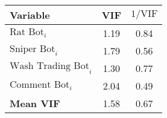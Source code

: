 \begin{tabular}{lcc}
\hline
Variable & VIF & $1/\text{VIF}$ \\
\hline
$\text{Rat Bot}_{i}$ & 1.19 & 0.84 \\
$\text{Sniper Bot}_{i}$ & 1.79 & 0.56 \\
$\text{Wash Trading Bot}_{i}$ & 1.30 & 0.77 \\
$\text{Comment Bot}_{i}$ & 2.04 & 0.49 \\
\hline
\textbf{Mean VIF} & 1.58 & 0.67 \\
\hline
\end{tabular}